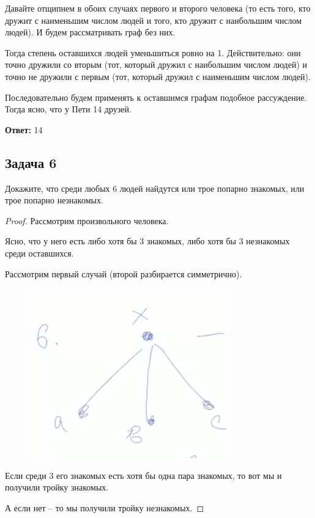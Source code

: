 \begin{solution*}
Давайте отщипнем в обоих случаях первого и второго человека (то есть того, кто дружит с наименьшим числом людей и того, кто дружит с наибольшим числом людей). И будем рассматривать граф без них.

Тогда степень оставшихся людей уменьшиться ровно на 1. Действительно: они точно дружили со вторым (тот, который дружил с наибольшим числом людей) и точно не дружили с первым (тот, который дружил с наименьшим числом людей). 

Последовательно будем применять к оставшимся графам подобное рассуждение. Тогда ясно, что у Пети 14 друзей.

\textbf{Ответ:} 14

\subsection{Задача 6}

Докажите, что среди любых 6 людей найдутся или трое попарно знакомых, или трое
попарно незнакомых.

\begin{proof}
Рассмотрим произвольного человека.

Ясно, что у него есть либо хотя бы 3 знакомых, либо хотя бы 3 незнакомых среди оставшихся.

Рассмотрим первый случай (второй разбирается симметрично). 

\begin{figure}[H]
    \centering
    \includegraphics[width=0.5\linewidth]{Figures/sem08_task6.png}
\end{figure}

Если среди 3 его знакомых есть хотя бы одна пара знакомых, то вот мы и получили тройку знакомых.

А если нет -- то мы получили тройку незнакомых.
\end{proof}


\end{solution*}